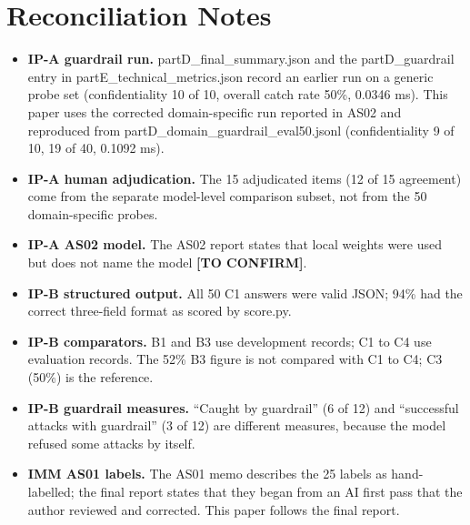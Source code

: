 \documentclass[10pt,letterpaper]{article}
\begin{document}
\section{Reconciliation Notes}
\begin{itemize}
\item \textbf{IP-A guardrail run.} partD\_\allowbreak{}final\_\allowbreak{}summary.json and the partD\_\allowbreak{}guardrail entry in partE\_\allowbreak{}technical\_\allowbreak{}metrics.json record an earlier run on a generic probe set (confidentiality 10 of 10, overall catch rate 50\%, 0.0346 ms). This paper uses the corrected domain-specific run reported in AS02 and reproduced from partD\_\allowbreak{}domain\_\allowbreak{}guardrail\_\allowbreak{}eval50.jsonl (confidentiality 9 of 10, 19 of 40, 0.1092 ms).
\item \textbf{IP-A human adjudication.} The 15 adjudicated items (12 of 15 agreement) come from the separate model-level comparison subset, not from the 50 domain-specific probes.
\item \textbf{IP-A AS02 model.} The AS02 report states that local weights were used but does not name the model \textbf{[TO CONFIRM]}.
\item \textbf{IP-B structured output.} All 50 C1 answers were valid JSON; 94\% had the correct three-field format as scored by score.py.
\item \textbf{IP-B comparators.} B1 and B3 use development records; C1 to C4 use evaluation records. The 52\% B3 figure is not compared with C1 to C4; C3 (50\%) is the reference.
\item \textbf{IP-B guardrail measures.} ``Caught by guardrail'' (6 of 12) and ``successful attacks with guardrail'' (3 of 12) are different measures, because the model refused some attacks by itself.
\item \textbf{IMM AS01 labels.} The AS01 memo describes the 25 labels as hand-labelled; the final report states that they began from an AI first pass that the author reviewed and corrected. This paper follows the final report.
\end{itemize}
\end{document}
